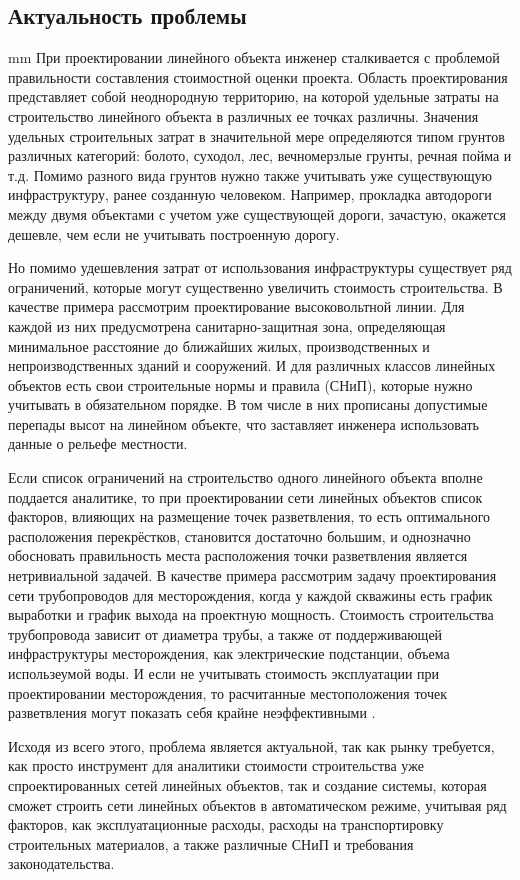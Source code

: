 \subsection*{\Large{Актуальность проблемы}}
 mm
При проектировании линейного объекта инженер сталкивается с
проблемой правильности составления стоимостной оценки проекта.
Область проектирования представляет собой неоднородную территорию,
на которой удельные затраты на строительство линейного объекта в различных ее точках различны.
Значения удельных строительных затрат в значительной мере определяются типом грунтов различных категорий:
болото, суходол, лес, вечномерзлые грунты, речная пойма и т.д.
Помимо разного вида грунтов нужно также учитывать уже существующую инфраструктуру,
ранее созданную человеком. Например, прокладка автодороги между двумя объектами с учетом уже существующей дороги,
зачастую, окажется дешевле, чем если не учитывать построенную дорогу.
\par
Но помимо удешевления затрат от использования инфраструктуры существует ряд ограничений,
которые могут существенно увеличить стоимость строительства.
В качестве примера рассмотрим проектирование высоковольтной линии.
Для каждой из них предусмотрена санитарно-защитная зона, определяющая минимальное расстояние
до ближайших жилых, производственных и непроизводственных зданий и сооружений.
И для различных классов линейных объектов есть свои строительные нормы и правила (СНиП),
которые нужно учитывать в обязательном порядке. В том числе в них прописаны допустимые
перепады высот на линейном объекте, что заставляет инженера использовать данные о рельефе местности.
\par
Если список ограничений на строительство одного линейного объекта вполне поддается аналитике,
то при проектировании сети линейных объектов список факторов, влияющих на размещение точек разветвления,
то есть оптимального расположения перекрёстков, становится достаточно большим,
и однозначно обосновать правильность места расположения точки разветвления является нетривиальной задачей.
В качестве примера рассмотрим задачу проектирования сети трубопроводов для месторождения,
когда у каждой скважины есть график выработки и график выхода на проектную мощность.
Стоимость строительства трубопровода зависит от диаметра трубы, а также от поддерживающей инфраструктуры месторождения,
как электрические подстанции, объема использеумой воды. И если не учитывать стоимость эксплуатации
при проектировании месторождения,
то расчитанные местоположения точек разветвления могут показать себя крайне неэффективными \cite{GasAndOil}.
\par
Исходя из всего этого, проблема является актуальной, так как рынку требуется, как просто инструмент для аналитики стоимости строительства уже спроектированных сетей линейных объектов, так и создание системы, которая сможет строить сети линейных объектов в автоматическом режиме, учитывая ряд факторов, как эксплуатационные расходы, расходы на транспортировку строительных материалов, а также различные СНиП и требования законодательства.


